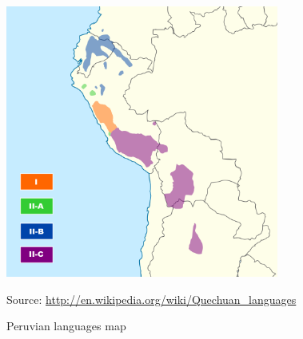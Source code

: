 \begin{figure}[!ht]
\begin{center}
\includegraphics[width=0.8\textwidth]{figures/yqgi03}
\end{center}
\caption{Peruvian languages map}\label{Figsim}
\raggedright
{\scriptsize Source: \url{http://en.wikipedia.org/wiki/Quechuan_languages}}
\end{figure}

